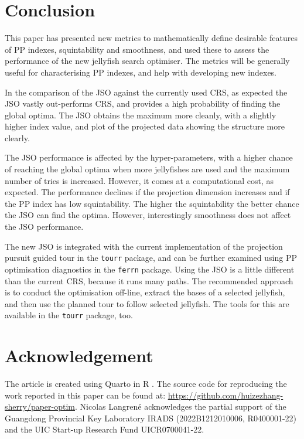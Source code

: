\documentclass[
  number,
  preprint,
  3p]{elsarticle}
\begin{document}
\section{Conclusion}\label{sec-conclusion}

This paper has presented new metrics to mathematically define desirable
features of PP indexes, squintability and smoothness, and used these to
assess the performance of the new jellyfish search optimiser. The
metrics will be generally useful for characterising PP indexes, and help
with developing new indexes.

In the comparison of the JSO against the currently used CRS, as expected
the JSO vastly out-performs CRS, and provides a high probability of
finding the global optima. The JSO obtains the maximum more cleanly,
with a slightly higher index value, and plot of the projected data
showing the structure more clearly.

The JSO performance is affected by the hyper-parameters, with a higher
chance of reaching the global optima when more jellyfishes are used and
the maximum number of tries is increased. However, it comes at a
computational cost, as expected. The performance declines if the
projection dimension increases and if the PP index has low
squintability. The higher the squintability the better chance the JSO
can find the optima. However, interestingly smoothness does not affect
the JSO performance.

The new JSO is integrated with the current implementation of the
projection pursuit guided tour in the \texttt{tourr} package, and can be
further examined using PP optimisation diagnostics in the \texttt{ferrn}
package. Using the JSO is a little different than the current CRS,
because it runs many paths. The recommended approach is to conduct the
optimisation off-line, extract the bases of a selected jellyfish, and
then use the planned tour to follow selected jellyfish. The tools for
this are available in the \texttt{tourr} package, too.

\section{Acknowledgement}\label{acknowledgement}

The article is created using Quarto \citep{Allaire_Quarto_2022} in R
\citep{R}. The source code for reproducing the work reported in this
paper can be found at:
\url{https://github.com/huizezhang-sherry/paper-optim}. Nicolas Langrené
acknowledges the partial support of the Guangdong Provincial Key
Laboratory IRADS (2022B1212010006, R0400001-22) and the UIC Start-up
Research Fund UICR0700041-22.


\renewcommand\refname{References}
  
\end{document}
